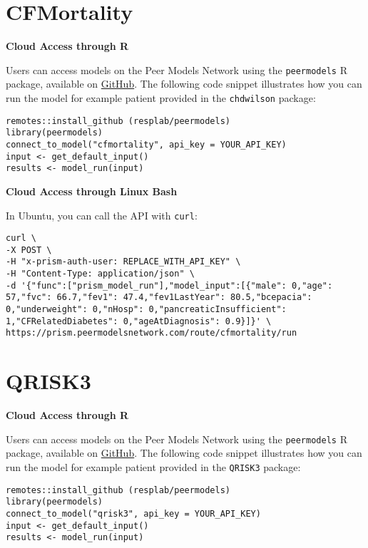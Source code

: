 \documentclass[
]{book}
\begin{document}
\hypertarget{cfmortality-1}{%
\section{CFMortality}\label{cfmortality-1}}

\textbf{Cloud Access through R}

Users can access models on the Peer Models Network using the \texttt{peermodels} R package, available on \href{https://github.com/resplab/peermodels}{GitHub}. The following code snippet illustrates how you can run the model for example patient provided in the \texttt{chdwilson} package:

\begin{verbatim}
remotes::install_github (resplab/peermodels)
library(peermodels)
connect_to_model("cfmortality", api_key = YOUR_API_KEY)
input <- get_default_input()
results <- model_run(input)
\end{verbatim}

\textbf{Cloud Access through Linux Bash}

In Ubuntu, you can call the API with \texttt{curl}:

\begin{verbatim}
curl \
-X POST \
-H "x-prism-auth-user: REPLACE_WITH_API_KEY" \
-H "Content-Type: application/json" \
-d '{"func":["prism_model_run"],"model_input":[{"male": 0,"age": 57,"fvc": 66.7,"fev1": 47.4,"fev1LastYear": 80.5,"bcepacia": 0,"underweight": 0,"nHosp": 0,"pancreaticInsufficient": 1,"CFRelatedDiabetes": 0,"ageAtDiagnosis": 0.9}]}' \
https://prism.peermodelsnetwork.com/route/cfmortality/run
\end{verbatim}

\hypertarget{qrisk3-1}{%
\section{QRISK3}\label{qrisk3-1}}

\textbf{Cloud Access through R}

Users can access models on the Peer Models Network using the \texttt{peermodels} R package, available on \href{https://github.com/resplab/peermodels}{GitHub}. The following code snippet illustrates how you can run the model for example patient provided in the \texttt{QRISK3} package:

\begin{verbatim}
remotes::install_github (resplab/peermodels)
library(peermodels)
connect_to_model("qrisk3", api_key = YOUR_API_KEY)
input <- get_default_input()
results <- model_run(input)
\end{verbatim}
\end{document}
